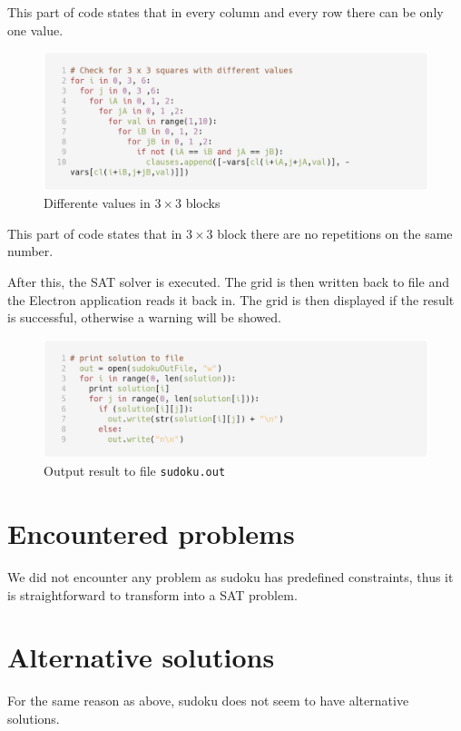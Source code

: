 \documentclass[10pt]{article}
\begin{document}
This part of code states that in every column and every row there
can be only one value.

\begin{figure}[H]
  \centering
  \includegraphics[width=\textwidth]{clause_04.png}
  \caption{Differente values in \(3 \times 3 \) blocks}
\end{figure}

This part of code states that in \(3 \times 3 \) block there are no
repetitions on the same number.
\par\vspace{0.5cm}

After this, the SAT solver is executed.
The grid is then written back to file and the Electron application reads it back in.
The grid is then displayed if the result is successful, otherwise a warning will be showed.

\begin{figure}[H]
  \centering
  \includegraphics[width=\textwidth]{printBack.png}
  \caption{Output result to file \texttt{sudoku.out}}
\end{figure}

\section*{Encountered problems}
We did not encounter any problem as sudoku has predefined constraints,
thus it is straightforward to transform into a SAT problem.

\section*{Alternative solutions}
For the same reason as above, sudoku does not seem to have alternative solutions.
\end{document}
